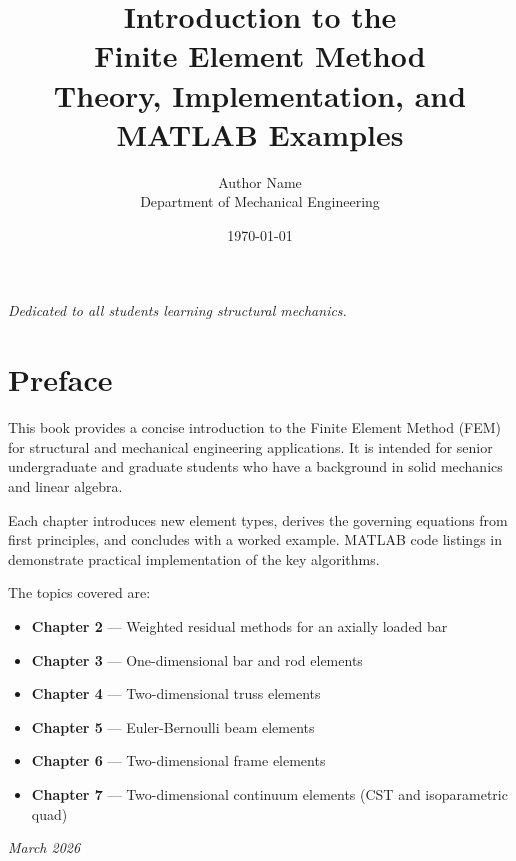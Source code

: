 \documentclass[12pt, a4paper, twoside, openright]{book}
\title{%
    \Huge\bfseries Introduction to the\\[0.5em]
    Finite Element Method\\[1em]
    \large Theory, Implementation, and MATLAB Examples
}
\author{%
    \Large Author Name\\[0.5em]
    \normalsize Department of Mechanical Engineering
}
\date{\today}
\begin{document}
\frontmatter

\maketitle
\thispagestyle{empty}
\clearpage

\vspace*{5cm}
\begin{center}
    \itshape
    Dedicated to all students learning structural mechanics.
\end{center}
\clearpage

\chapter*{Preface}

This book provides a concise introduction to the Finite Element Method (FEM) for
structural and mechanical engineering applications. It is intended for senior
undergraduate and graduate students who have a background in solid mechanics and
linear algebra.

Each chapter introduces new element types, derives the governing equations from
first principles, and concludes with a worked example. MATLAB code listings in
 demonstrate practical implementation of the key algorithms.

\bigskip
\noindent The topics covered are:
\begin{itemize}
    \item \textbf{Chapter 2} — Weighted residual methods for an axially loaded bar
    \item \textbf{Chapter 3} — One-dimensional bar and rod elements
    \item \textbf{Chapter 4} — Two-dimensional truss elements
    \item \textbf{Chapter 5} — Euler-Bernoulli beam elements
    \item \textbf{Chapter 6} — Two-dimensional frame elements
    \item \textbf{Chapter 7} — Two-dimensional continuum elements (CST and isoparametric quad)
\end{itemize}

\bigskip
\noindent\textit{March 2026}

\tableofcontents
\listoffigures
\listoftables

\mainmatter









\appendix


\backmatter



\end{document}
